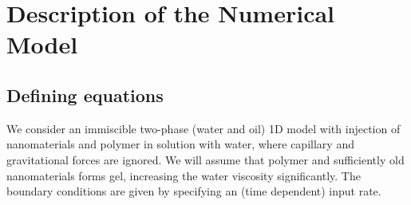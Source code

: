 \documentclass[energies,article,submit,moreauthors,pdftex]{Definitions/mdpi}
\begin{document}



\appendix
\section{Description of the Numerical Model}
\unskip
\subsection{Defining equations}
We consider an immiscible two-phase (water and oil) 1D model with injection of nanomaterials and polymer in solution with water, where capillary and gravitational forces are ignored. We will assume that polymer and sufficiently old nanomaterials forms gel, increasing the water viscosity significantly. The boundary conditions are given by specifying an (time dependent) input rate. 
\end{document}

